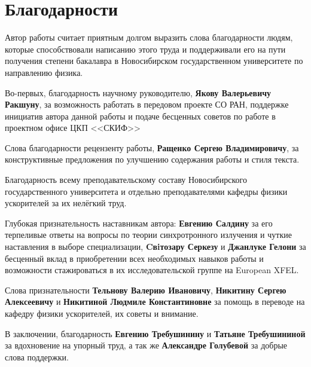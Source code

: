 \chapter*{Благодарности}
Автор работы считает приятным долгом выразить слова благодарности людям, которые способствовали написанию этого труда и поддерживали его на пути получения степени бакалавра в Новосибирском государственном университете по направлению физика.

Во-первых, благодарность научному руководителю, \textbf{Якову Валерьевичу Ракшуну}, за возможность работать в передовом проекте СО РАН, поддержке инициатив автора данной работы и подаче бесценных советов по работе в проектном офисе ЦКП <<СКИФ>>

Слова благодарности рецензенту работы, \textbf{Ращенко Сергею Владимировичу}, за конструктивные предложения по улучшению содержания работы и стиля текста.

Благодарность всему преподавательскому составу Новосибирского государственного университета и отдельно преподавателями кафедры физики ускорителей за их нелёгкий труд.

Глубокая признательность наставникам автора: \textbf{Евгению Салдину} за его терпеливые ответы на вопросы по теории синхротронного излучения и чуткие наставления в выборе специализации, \textbf{Cвiтозару Серкезу} и \textbf{Джанлуке Гелони} за бесценный вклад в приобретении всех необходимых навыков работы и возможности стажироваться в их исследовательской группе на European XFEL.

Слова признательности \textbf{Тельнову Валерию Ивановичу}, \textbf{Никитину Сергею Алексеевичу} и \textbf{Никитиной Людмиле Константиновне} за помощь в переводе на кафедру физики ускорителей, их советы и внимание.

В заключении, благодарность \textbf{Евгению Требушинину} и \textbf{Татьяне Требушининой} за вдохновение на упорный труд, а так же \textbf{Александре Голубевой} за добрые слова поддержки.